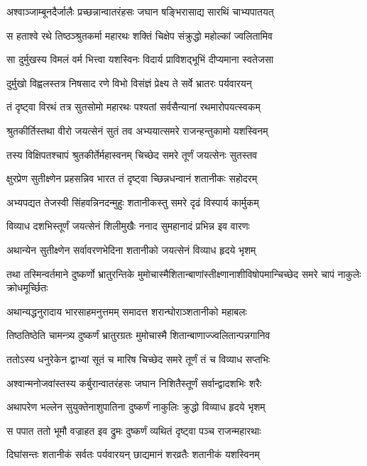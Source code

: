 \twolineshloka
{अश्वाञ्जाम्बूनदैर्जालैः प्रच्छन्नान्वातरंहसः}
{जघान षङ्भिरासाद्य सारथिं चाभ्यपातयत्}


\twolineshloka
{स हताश्वे रथे तिष्ठञ्श्रुतकर्मा महारथः}
{शक्तिं चिक्षेप संक्रुद्धो महोल्कां ज्वलितामिव}


\twolineshloka
{सा दुर्मुखस्य विमलं वर्म भित्त्वा यशस्विनः}
{विदार्य प्राविशद्भूभिं दीप्यमाना स्वतेजसा}


\twolineshloka
{दुर्मुखो विह्वलस्तत्र निषसाद रणे विभो}
{विसंज्ञं प्रेक्ष्य ते सर्वे भ्रातरः पर्यवारयन्}


\twolineshloka
{तं दृष्ट्वा विरथं तत्र सुतसोमो महारथः}
{पश्यतां सर्वसैन्यानां रथमारोपयत्स्वकम्}


\twolineshloka
{श्रुतकीर्तिस्तथा वीरो जयत्सेनं सुतं तव}
{अभ्ययात्समरे राजन्हन्तुकामो यशस्विनम्}


\twolineshloka
{तस्य विक्षिपतश्चापं श्रुतकीर्तेर्महास्वनम्}
{चिच्छेद समरे तूर्णं जयत्सेनः सुतस्तव}


\twolineshloka
{क्षुरप्रेण सुतीक्ष्णेन प्रहसन्निव भारत}
{तं दृष्ट्वा च्छिन्नधन्वानं शतानीकः सहोदरम्}


\twolineshloka
{अभ्यपद्यत तेजस्वी सिंहवन्निनदन्मुहुः}
{शतानीकस्तु समरे दृढं विस्पार्य कार्मुकम्}


\twolineshloka
{विव्याध दशभिस्तूर्णं जयत्सेनं शिलीमुखैः}
{ननाद सुमहानादं प्रभिन्न इव वारणः}


\twolineshloka
{अथान्येन सुतीक्ष्णेन सर्वावरणभेदिना}
{शतानीको जयत्सेनं विव्याध हृदये भृशम्}


\twolineshloka
{तथा तस्मिन्वर्तमाने दुष्कर्णो भ्रातुरन्तिके}
{मुमोचास्मैशितान्बाणांस्तीक्ष्णानाशीविषोपमान्चिच्छेद समरे चापं नाकुलेः क्रोधमूर्च्छितः}


\twolineshloka
{अथान्यद्धनुरादाय भारसाहमनुत्तमम्}
{समादत्त शरान्घोराञ्शतानीको महाबलः}


\twolineshloka
{तिष्ठतिष्ठेति चामन्त्र्य दुष्कर्णं भ्रातुरग्रतः}
{मुमोचास्मै शितान्बाणाज्ज्वलितान्पन्नगानिव}


\twolineshloka
{ततोऽस्य धनुरेकेन द्वाभ्यां सूतं च मारिष}
{चिच्छेद समरे तूर्णं तं च विव्याध सप्तभिः}


\twolineshloka
{अश्वान्मनोजवांस्तस्य कर्बुरान्वातरंहसः}
{जघान निशितैस्तूर्णं सर्वान्द्वादशभिः शरैः}


\twolineshloka
{अथापरेण भल्लेन सुयुक्तेनाशुपातिना}
{दुष्कर्णं नाकुलिः क्रुद्धो विव्याध हृदये भृशम्}


\twolineshloka
{स पपात ततो भूमौ वज्राहत इव द्रुमः}
{दुष्कर्णं व्यथितं दृष्ट्वा पञ्च राजन्महारथाः}


\twolineshloka
{दिघांसन्तः शतानीकं सर्वतः पर्यवारयन्}
{छाद्यमानं शरव्रतैः शतानीकं यशस्विनम्}


